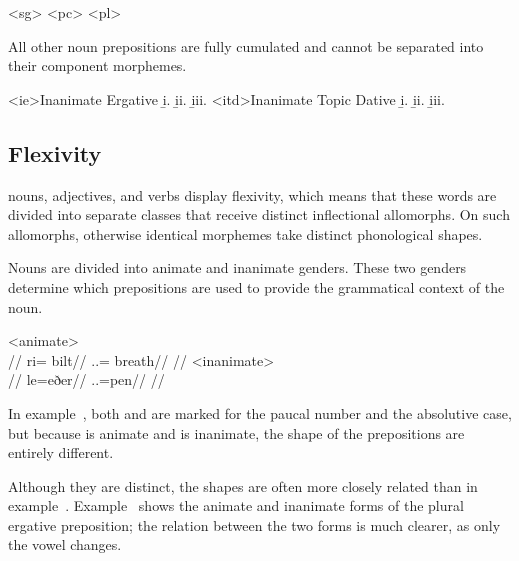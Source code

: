 	\a<sg>  
	\a<pc>  
	\a<pl>  
\xe

All other noun prepositions are fully cumulated and cannot be separated into their component morphemes.

	\a<ie>Inanimate Ergative
	\beginsubsub
		\b{i.}  
		\b{ii.}  
		\b{iii.}  
	\endsubsub
	\a<itd>Inanimate Topic Dative
	\beginsubsub
		\b{i.}  
		\b{ii.}  
		\b{iii.}  
	\endsubsub
\xe


\subsection{Flexivity}
\label{subsec:tvk-flexivity}

\langtvk{} nouns, adjectives, and verbs display flexivity, which means that these words are divided into separate classes that receive distinct inflectional allomorphs. On such allomorphs, otherwise identical morphemes take distinct phonological shapes.

Nouns are divided into animate and inanimate genders. These two genders determine which prepositions are used to provide the grammatical context of the noun.

	\a<animate>\begingl
		\glpreamble{}\\
		//
		\gla ri= bilt//
		\glb \An.\Pc.\Abs= breath//
		\glft {}//
	\endgl
	\a<inanimate>\begingl
		\glpreamble{}\\
		//
		\gla le=eðer//
		\glb \In.\Pc.\Abs=pen//
		\glft {}//
	\endgl
\xe

In example~, both  and  are marked for the paucal number and the absolutive case, but because  is animate and  is inanimate, the shape of the prepositions are entirely different.

Although they are distinct, the shapes are often more closely related than in example~. Example~ shows the animate and inanimate forms of the plural ergative preposition; the relation between the two forms is much clearer, as only the vowel changes.

